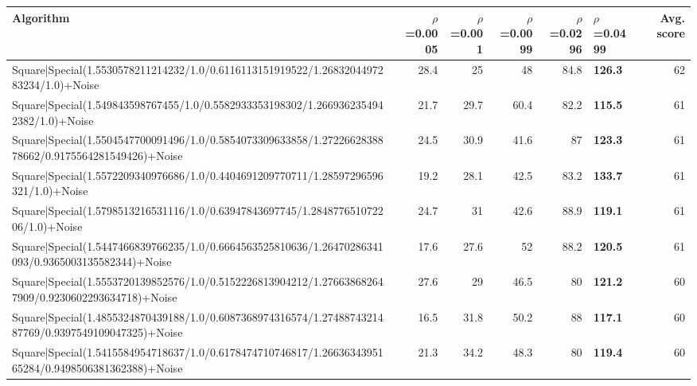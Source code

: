 \begin{tabular}{lrrrrlr}
\hline
 Algorithm                                                                                                                     &   $\rho$=0.0005 &   $\rho$=0.001 &   $\rho$=0.0099 &   $\rho$=0.0296 & $\rho$=0.0499   &   Avg. score \\
\hline
 Square|Special(1.5530578211214232/1.0/0.6116113151919522/1.2683204497283234/1.0)+Noise                                        &            28.4 &           25   &            48   &            84.8 & \textbf{126.3}  &           62 \\
 Square|Special(1.549843598767455/1.0/0.5582933353198302/1.2669362354942382/1.0)+Noise                                         &            21.7 &           29.7 &            60.4 &            82.2 & \textbf{115.5}  &           61 \\
 Square|Special(1.5504547700091496/1.0/0.5854073309633858/1.2722662838878662/0.9175564281549426)+Noise                         &            24.5 &           30.9 &            41.6 &            87   & \textbf{123.3}  &           61 \\
 Square|Special(1.5572209340976686/1.0/0.4404691209770711/1.28597296596321/1.0)+Noise                                          &            19.2 &           28.1 &            42.5 &            83.2 & \textbf{133.7}  &           61 \\
 Square|Special(1.5798513216531116/1.0/0.63947843697745/1.284877651072206/1.0)+Noise                                           &            24.7 &           31   &            42.6 &            88.9 & \textbf{119.1}  &           61 \\
 Square|Special(1.5447466839766235/1.0/0.6664563525810636/1.26470286341093/0.9365003135582344)+Noise                           &            17.6 &           27.6 &            52   &            88.2 & \textbf{120.5}  &           61 \\
 Square|Special(1.5553720139852576/1.0/0.5152226813904212/1.276638682647909/0.9230602293634718)+Noise                          &            27.6 &           29   &            46.5 &            80   & \textbf{121.2}  &           60 \\
 Square|Special(1.4855324870439188/1.0/0.6087368974316574/1.2748874321487769/0.9397549109047325)+Noise                         &            16.5 &           31.8 &            50.2 &            88   & \textbf{117.1}  &           60 \\
 Square|Special(1.5415584954718637/1.0/0.6178474710746817/1.2663634395165284/0.9498506381362388)+Noise                         &            21.3 &           34.2 &            48.3 &            80   & \textbf{119.4}  &           60 \\

\end{tabular}
